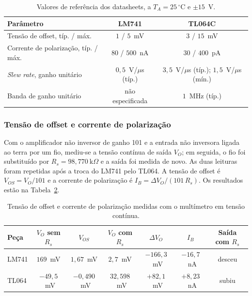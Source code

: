 \documentclass[11pt,a4paper]{article}
\begin{document}
\begin{table}[H]
\centering
\caption{Valores de referência dos datasheets, a $T_A=25\,^{\circ}$C e $\pm15$~V.}
\label{tab:datasheet_equipe}
\renewcommand{\arraystretch}{1.2}
\begin{tabular}{@{}lcc@{}}
\toprule
\textbf{Parâmetro} & \textbf{LM741} & \textbf{TL064C} \\
\midrule
Tensão de offset, típ. / máx. & $1$ / $5$~mV & $3$ / $15$~mV \\
Corrente de polarização, típ. / máx. & $80$ / $500$~nA & $30$ / $400$~pA \\
\textit{Slew rate}, ganho unitário & $0{,}5$~V/$\mu$s (típ.) & $3{,}5$~V/$\mu$s (típ.); $1{,}5$~V/$\mu$s (mín.) \\
Banda de ganho unitário & não especificada & $1$~MHz (típ.) \\
\bottomrule
\end{tabular}
\end{table}

\subsubsection{Tensão de offset e corrente de polarização}

Com o amplificador não inversor de ganho 101 e a entrada não inversora ligada ao terra por um fio, mediu-se a tensão contínua de saída $V_O$; em seguida, o fio foi substituído por $R_s=98{,}770~\mathrm{k}\Omega$ e a saída foi medida de novo. As duas leituras foram repetidas após a troca do LM741 pelo TL064. A tensão de offset é $V_{OS}=V_O/101$ e a corrente de polarização é $I_B=\Delta V_O/(101\,R_s)$. Os resultados estão na Tabela~\ref{tab:offset_ib_equipe}.

\begin{table}[H]
\centering
\caption{Tensão de offset e corrente de polarização medidas com o multímetro em tensão contínua.}
\label{tab:offset_ib_equipe}
\renewcommand{\arraystretch}{1.2}
\begin{tabular}{@{}lcccccc@{}}
\toprule
\textbf{Peça} & \textbf{$V_O$ sem $R_s$} & \textbf{$V_{OS}$} & \textbf{$V_O$ com $R_s$} & \textbf{$\Delta V_O$} & \textbf{$I_B$} & \textbf{Saída com $R_s$} \\
\midrule
LM741 & $169$~mV & $1{,}67$~mV & $2{,}7$~mV & $-166{,}3$~mV & $-16{,}7$~nA & desceu \\
TL064 & $-49{,}5$~mV & $-0{,}490$~mV & $32{,}598$~mV & $+82{,}1$~mV & $+8{,}23$~nA & subiu \\
\bottomrule
\end{tabular}
\end{table}
\end{document}

